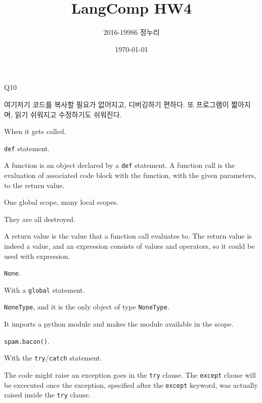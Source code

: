 \documentclass[a4paper,11pt]{scrartcl}
\title{\vspace{-0.5in}LangComp HW4}
\author{\vspace{-15pt}2016-19986 정누리}
\date{\vspace{-5pt}\today}
\begin{document}
\maketitle

\begin{labeling}{Q10}
  \item[Q1]
  여기저기 코드를 복사할 필요가 없어지고, 디버깅하기 편하다. 또 프로그램이 짧아지며, 읽기 쉬워지고 수정하기도 쉬워진다.

  \item[Q2]
  When it gets called.

  \item[Q3]
  \lstinline{def} statement.

  \item[Q4]
  A function is an object declared by a \lstinline{def} statement. A function call is the evaluation of associated code block with the function, with the given parameters, to the return value.

  \item[Q5]
  One global scope, many local scopes.

  \item[Q6]
  They are all destroyed.

  \item[Q7]
  A return value is the value that a function call evaluates to. The return value is indeed a value, and an expression consists of values and operators, so it could be used with expression.

  \item[Q8]
  \lstinline{None}.

  \item[Q9]
  With a \lstinline{global} statement.

  \item[Q10]
  \lstinline{NoneType}, and it is the only object of type \lstinline{NoneType}.

  \item[Q11]
  It imports a python module and makes the module available in the scope.

  \item[Q12]
  \lstinline{spam.bacon()}.

  \item[Q13]
  With the \lstinline{try}/\lstinline{catch} statement.

  \item[Q14]
  The code might raise an exception goes in the \lstinline{try} clause. The \lstinline{except} clause will be excecuted once the exception, specified after the \lstinline{except} keyword, was actually raised inside the \lstinline{try} clause.

\end{labeling}
\end{document}
